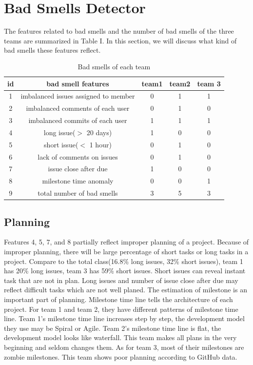 \documentclass[conference]{IEEEtran}
\begin{document}
\section{Bad Smells Detector}
The features related to bad smells and the number of bad smells of the three teams are summarized in Table I. In this section, we will discuss what kind of bad smells these features reflect.

\begin{table}[!htb]\centering
 \begin{tabular}{|c|c|c|c|c|}
 \hline
 id &bad smell features  & team1 & team2 & team 3\\
 \hline
 1&imbalanced issues assigned to member& 0 & 1 & 1\\
 \hline
 2&imbalanced comments of each user  & 0 & 1 & 0\\
 \hline
 3&imbalanced commits of each user & 1 & 1 & 1\\
 \hline
 4&long issue($>$ 20 days)  & 1 & 0 & 0\\
 \hline
 5&short issue($<$ 1 hour)  & 0 & 1 & 0\\
 \hline
 6&lack of comments on issues & 0 & 1 & 0\\
 \hline
 7&issue close after due   & 1 & 0 & 0\\
 \hline
 8&milestone time anomaly & 0 & 0 & 1\\
 \hline
 9&total number of bad smells & 3 & 5 & 3\\
 \hline
 \end{tabular}
 \label{TBfeature}
 \caption{Bad smells of each team}
\end{table} 

\subsection{Planning}
Features 4, 5, 7, and 8 partially reflect improper planning of a project. Because of improper planning, there will be large percentage of short tasks or long tasks in a project. Compare to the total class(16.8\% long issues, 32\% short issues), team 1 has 20\% long issues, team 3 has 59\% short issues. Short issues can reveal instant task that are not in plan. Long issues and number of issue close after due may reflect difficult tasks which are not well planed. 
The estimation of milestone is an important part of planning. Milestone time line tells the architecture of each project. For team 1 and team 2, they have different patterns of milestone time line. Team 1's milestone time line increases step by step, the development model they use may be Spiral or Agile. Team 2's milestone time line is flat, the development model looks like waterfall. This team makes all plans in the very beginning and seldom changes them. As for team 3, most of their milestones are zombie milestones. This team shows poor planning according to GitHub data.
\end{document}
